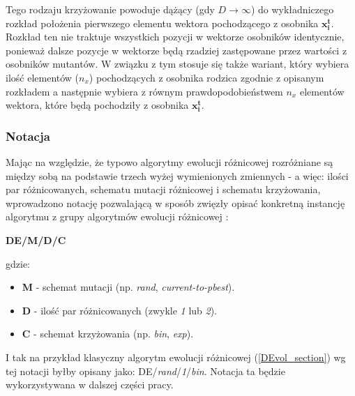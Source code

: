 \documentclass[12pt,a4paper]{report}
\begin{document}
{{{{\begin{description}
Tego rodzaju krzyżowanie powoduje dążący (gdy $D \rightarrow \infty$) do wykładniczego rozkład położenia pierwszego elementu wektora pochodzącego z osobnika $\mathbf{x_i^t}$. Rozkład ten nie traktuje wszystkich pozycji w wektorze osobników identycznie, ponieważ dalsze pozycje w wektorze będą rzadziej zastępowane przez wartości z osobników mutantów. W związku z tym stosuje się także wariant, który wybiera ilość elementów ($n_x$) pochodzących z osobnika rodzica zgodnie z opisanym rozkładem a następnie wybiera z równym prawdopodobieństwem $n_x$ elementów wektora, które będą pochodziły z osobnika $\mathbf{x_i^t}$.
\end{description}
}
\subsubsection{Notacja}
\par{
Mając na względzie, że typowo algorytmy ewolucji różnicowej rozróżniane są między sobą na podstawie trzech wyżej wymienionych zmiennych - a więc: ilości par różnicowanych, schematu mutacji różnicowej i schematu krzyżowania, wprowadzono notację pozwalającą w sposób zwięzły opisać konkretną instancję algorytmu z grupy algorytmów ewolucji różnicowej \cite{PracticalInsights}:
\begin{center}
\textbf{DE/M/D/C}
\end{center}
gdzie:
\begin{itemize}
\item \textbf{M} - schemat mutacji (np. \emph{rand}, \emph{current-to-pbest}).
\item \textbf{D} - ilość par różnicowanych (zwykle \emph{1} lub \emph{2}).
\item \textbf{C} - schemat krzyżowania (np. \emph{bin}, \emph{exp}).
\end{itemize}
I tak na przykład klasyczny algorytm ewolucji różnicowej (\ref{DEvol_section}) wg tej notacji byłby opisany jako: DE/\emph{rand}/\emph{1}/\emph{bin}. Notacja ta będzie wykorzystywana w dalszej części pracy.
}


}}}
\end{document}
